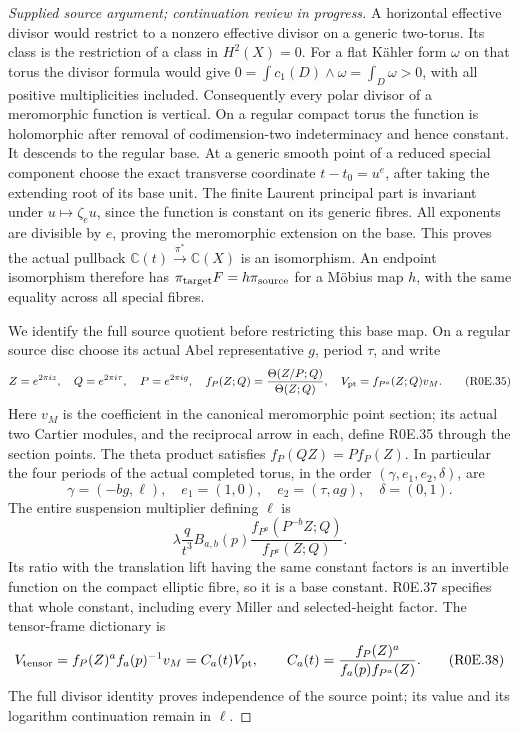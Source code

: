 \begin{proof}[Supplied source argument; continuation review in progress]
A horizontal effective divisor would restrict to a nonzero effective
divisor on a generic two-torus. Its class is the restriction of a
class in \(H^2(X)=0\). For a flat Kähler form \(\omega\) on that
torus the divisor formula would give
\(0=\int c_1(D)\wedge\omega=\int_D\omega>0\), with all positive
multiplicities included. Consequently every polar divisor of a
meromorphic function is vertical. On a regular compact torus the
function is holomorphic after removal of codimension-two indeterminacy
and hence constant. It descends to the regular base. At a generic
smooth point of a reduced special component choose the exact
transverse coordinate \(t-t_0=u^e\), after taking the extending root
of its base unit. The finite Laurent principal part is invariant
under \(u\mapsto\zeta_eu\), since the function is constant on its
generic fibres. All exponents are divisible by \(e\), proving the
meromorphic extension on the base. This proves the actual pullback
\(\mathbb C(t)\xrightarrow{\pi^*}\mathbb C(X)\) is an isomorphism.
An endpoint isomorphism therefore has
\(\pi_{\rm target}F=h\pi_{\rm source}\) for a Möbius map \(h\),
with the same equality across all special fibres.

We identify the full source quotient before restricting this base map.
On a regular source disc choose its actual Abel representative
\(g\), period \(\tau\), and write
\[
 Z=e^{2\pi iz},\quad Q=e^{2\pi i\tau},\quad P=e^{2\pi ig},
 \quad f_P(Z;Q)=\frac{\Theta(Z/P;Q)}{\Theta(Z;Q)},\quad
 V_{\rm pt}=f_{P^a}(Z;Q)v_M.
 \tag{R0E.35}
\]
Here \(v_M\) is the coefficient in the canonical meromorphic point
section; its actual two Cartier modules, and the reciprocal arrow in
each, define R0E.35 through the section points. The theta product
satisfies \(f_P(QZ)=P f_P(Z)\). In particular the four periods of
the actual completed torus, in the order
\((\gamma,e_1,e_2,\delta)\), are
\[
 \gamma=(-bg,\ell),\quad e_1=(1,0),\quad
 e_2=(\tau,ag),\quad\delta=(0,1).
 \tag{R0E.36}
\]
The entire suspension multiplier defining \(\ell\) is
\[
 \lambda\frac q{t^3}B_{a,b}(p)
       \frac{f_{P^a}(P^{-b}Z;Q)}{f_{P^a}(Z;Q)}.
 \tag{R0E.37}
\]
Its ratio with the translation lift having the same constant factors
is an invertible function on the compact elliptic fibre, so it is a
base constant. R0E.37 specifies that whole constant, including every
Miller and selected-height factor. The tensor-frame dictionary is
\[
 V_{\rm tensor}=f_P(Z)^a f_a(p)^{-1}v_M
        =C_a(t)V_{\rm pt},\qquad
 C_a(t)=\frac{f_P(Z)^a}{f_a(p)f_{P^a}(Z)}.
 \tag{R0E.38}
\]
The full divisor identity proves independence of the source point;
its value and its logarithm continuation remain in \(\ell\).


\end{proof}
